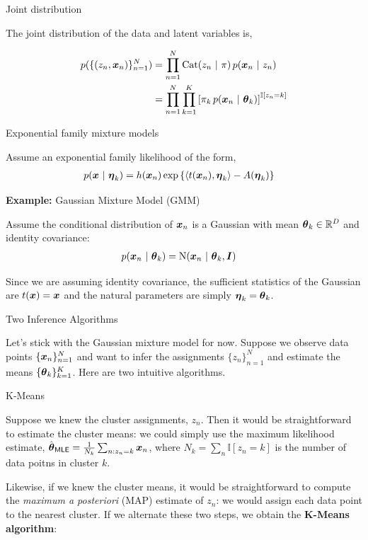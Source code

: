 \documentclass[aspectratio=169]{beamer}
\begin{document}
\begin{frame}[t, allowframebreaks]{Joint distribution}\label{joint-distribution}

The joint distribution of the data and latent variables is,

\begin{align*}
    p(\{(z_n, \boldsymbol{x}_n)\}_{n=1}^N) 
    &= \prod_{n=1}^N \mathrm{Cat}(z_n ~\vert~ \pi) \, p(\boldsymbol{x}_n ~\vert~ z_n) \\
    &= \prod_{n=1}^N \prod_{k=1}^K \left[ \pi_k \, p(\boldsymbol{x}_n ~\vert~ \boldsymbol{\theta}_k) \right]^{\mathbb{I}[z_n = k]}
\end{align*}
\end{frame}

\begin{frame}[t, allowframebreaks]{Exponential family mixture
models}\label{exponential-family-mixture-models}

Assume an exponential family likelihood of the form, \begin{align*}
    p(\boldsymbol{x} ~\vert~ \boldsymbol{\eta}_k) &= h(\boldsymbol{x}_n) \exp \left \{\langle t(\boldsymbol{x}_n), \boldsymbol{\eta}_k \rangle - A(\boldsymbol{\eta}_k) \right \}
\end{align*}

\textbf{Example:} Gaussian Mixture Model (GMM)

Assume the conditional distribution of \(\boldsymbol{x}_n\) is a Gaussian with
mean \(\boldsymbol{\theta}_k \in \mathbb{R}^D\) and identity covariance: \begin{align*}
    p(\boldsymbol{x}_n ~\vert~ \boldsymbol{\theta}_k) &= \mathrm{N}(\boldsymbol{x}_n ~\vert~ \boldsymbol{\theta}_k, \boldsymbol{I})
\end{align*}

Since we are assuming identity covariance, the sufficient statistics of the Gaussian
are \(t(\boldsymbol{x}) = \boldsymbol{x}\) and the natural parameters are simply \(\boldsymbol{\eta}_k = \boldsymbol{\theta}_k\).
\end{frame}


\begin{frame}[t, allowframebreaks]{Two Inference Algorithms}\label{two-inference-algorithms}

Let's stick with the Gaussian mixture model for now. Suppose we observe
data points \(\{\boldsymbol{x}_n\}_{n=1}^N\) and want to infer the assignments
\(\{z_n\}_{n=1}^N\) and estimate the means \(\{\boldsymbol{\theta}_k\}_{k=1}^K\).
Here are two intuitive algorithms.
\end{frame}

\begin{frame}[t, allowframebreaks]{K-Means}\label{map-inference-and-k-means}

Suppose we knew the cluster assignments, \(z_n\). Then it would be
straightforward to estimate the cluster means: we could simply use the
maximum likelihood estimate,
\(\hat{\boldsymbol{\theta}}_{\mathsf{MLE}} = \frac{1}{N_k} \sum_{n: z_n=k} \boldsymbol{x}_n\),
where \(N_k = \sum_n \mathbb{I}[z_n =k]\) is the number of data poitns
in cluster \(k\).

Likewise, if we knew the cluster means, it would be straightforward to
compute the \emph{maximum a posteriori} (MAP) estimate of \(z_n\): we
would assign each data point to the nearest cluster. If we alternate
these two steps, we obtain the \textbf{K-Means algorithm}:
\end{frame}
\end{document}
